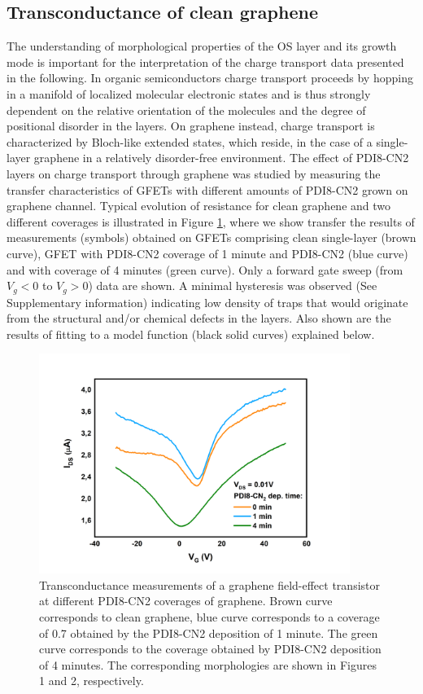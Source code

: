 \documentclass[preprint,aip,jap]{revtex4-2}
\begin{document}
\subsection{Transconductance of clean graphene}
\label{sec:clean}

The understanding of morphological properties of the OS layer and its growth mode is important for the interpretation of the charge transport data presented in the following.
  In organic semiconductors charge transport proceeds by hopping in a manifold of localized molecular electronic states and is thus strongly dependent on the relative orientation of the molecules and the degree of positional disorder in the layers.
  On graphene instead, charge transport is characterized by Bloch-like extended states, which reside, in the case of a single-layer graphene in a relatively disorder-free environment.
  The effect of PDI8-CN2 layers on charge transport through graphene was studied by measuring the transfer characteristics of GFETs with different amounts of PDI8-CN2 grown on graphene channel.
 Typical evolution of resistance for clean graphene and  two different coverages is illustrated in Figure \ref{fig:3}, where we show transfer the results of measurements (symbols) obtained on GFETs comprising clean single-layer (brown curve), GFET with PDI8-CN2 coverage of 1 minute and PDI8-CN2 (blue curve) and with coverage of 4 minutes (green curve).
  Only a forward gate sweep (from $V_g<0$ to $V_g>0$) data are shown.
 A minimal hysteresis was observed (See Supplementary information) indicating low density of traps that would originate from the structural and/or chemical defects in the layers.
 Also shown are the results of fitting to a model function (black solid curves) explained below.


\begin{figure}[htb]
  \centering
   \includegraphics[width=0.9\textwidth]{./Figures/fig3}  
  \caption{Transconductance measurements of a graphene field-effect transistor at different PDI8-CN2 coverages of graphene.
 Brown curve corresponds to clean graphene, blue curve corresponds to a coverage of 0.7 obtained by the PDI8-CN2 deposition of 1 minute.
 The green curve corresponds to the coverage obtained by PDI8-CN2 deposition of 4 minutes.
 The corresponding morphologies are shown in Figures 1 and 2, respectively.
 }
  \label{fig:3}
\end{figure}
\end{document}
